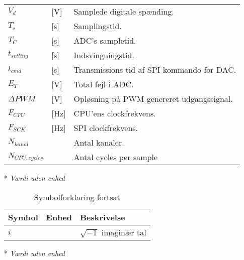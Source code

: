 \begin{table}[h!]
\begin{threeparttable}
\begin{tabular}{l l l}
$V_d$ & [\si{\volt}]& Samplede digitale spænding.\\
$T_s$ & [\si{\second}] & Samplingstid. \\
$T_C$ &[\si{\second}] & ADC's sampletid. \\
$t_{setling}$ &[\si{\second}] & Indsvingningstid. \\
$t_{cmd}$ & [\si{\second}] & Transmissions tid af SPI kommando for DAC.\\
$E_T$ & [\si{\volt}] & Total fejl i ADC. \\
$\Delta PWM$ & [\si{\volt}] & Opløsning på PWM genereret udgangssignal. \\
$F_{CPU}$ & [\si{\hertz}] & CPU'ens clockfrekvens. \\
$F_{SCK}$ & [\si{\hertz}] & SPI clockfrekvens.\\
$N_{kanal}$\tnote{*} & & Antal kanaler. \\
$N_{CPU,cycles}$ & & Antal cycles per sample \\
\bottomrule
\end{tabular}
\begin{tablenotes}
\item[*] \textit{Værdi uden enhed}
\end{tablenotes}
\end{threeparttable}
\end{table}




\begin{table}[h!]
\centering
\caption{Symbolforklaring fortsat}
\label{tab:symboler2}
\begin{threeparttable}
\begin{tabular}{l l l}
\toprule
\multicolumn{1}{l}{Symbol}       &
\multicolumn{1}{l}{Enhed}        &
\multicolumn{1}{l}{Beskrivelse}  \\ 
\midrule
$i$\tnote{*}		&								& $\sqrt{-1}$ imaginær tal	\\
\bottomrule
\end{tabular}
\begin{tablenotes}
\item[*] \textit{Værdi uden enhed}
\end{tablenotes}
\end{threeparttable}
\end{table}


